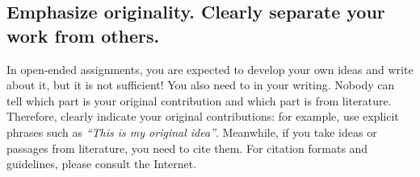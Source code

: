 \documentclass[11pt,pdfa,lastpage,minititle]{MishoNote}
\begin{document}
\subsection{Emphasize originality. Clearly separate your work from others.}
In open-ended assignments, you are expected to develop your own ideas and write about it, but it is not sufficient! You also need to  in your writing.
Nobody can tell which part is your original contribution and which part is from literature.
Therefore, clearly indicate your original contributions: for example, use explicit phrases such as \emph{``This is my original idea''}.
Meanwhile, if you take ideas or passages from literature, you need to cite them.
For citation formats and guidelines, please consult the Internet.
\end{document}
